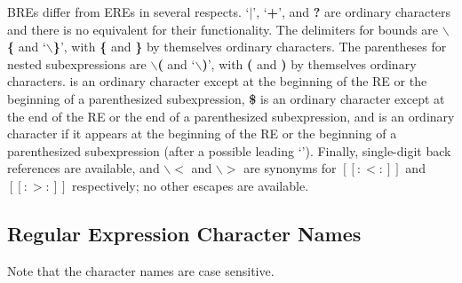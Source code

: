 BREs differ from EREs in
several respects.  `{\bf $|$}', `{\bf +}', and {\bf ?} are ordinary characters and there is no equivalent
for their functionality. The delimiters for bounds
are {\bf $\backslash$\{} and `{\bf $\backslash$\}}', with {\bf \{} and
 {\bf \}} by themselves ordinary characters. The parentheses for nested subexpressions
are {\bf $\backslash$(} and `{\bf $\backslash$)}', with {\bf (} and {\bf )} by themselves
ordinary characters. {\bf \caret} is an ordinary
character except at the beginning of the RE or the beginning of a parenthesized
subexpression, {\bf \$} is an ordinary character except at the end of the RE or
the end of a parenthesized subexpression, and {\bf *} is an ordinary character
if it appears at the beginning of the RE or the beginning of a parenthesized
subexpression (after a possible leading `{\bf \caret}'). Finally, single-digit back references
are available, and {\bf $\backslash<$} and {\bf $\backslash>$} are synonyms
for {\bf $[[:<:]]$} and {\bf $[[:>:]]$} respectively;
no other escapes are available.  

\subsection{Regular Expression Character Names}\label{wxresynchars}


Note that the character names are case sensitive.

